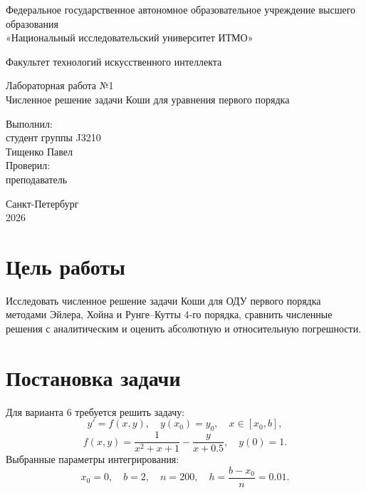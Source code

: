 \documentclass[12pt,a4paper]{article}
\begin{document}
\begin{titlepage}
\begin{center}
Федеральное государственное автономное образовательное учреждение высшего образования\\
«Национальный исследовательский университет ИТМО»
\end{center}

\vspace{1cm}
\begin{center}
Факультет технологий искусственного интеллекта
\end{center}

\vfill
\begin{center}
{\Large Лабораторная работа №1}\\[0.4cm]
{\large Численное решение задачи Коши для уравнения первого порядка}
\end{center}
\vfill

\begin{flushright}
Выполнил:\\
студент группы J3210\\
Тищенко Павел\\[0.8cm]
Проверил:\\
преподаватель\\
\underline{\hspace{4cm}}
\end{flushright}

\vfill
\begin{center}
Санкт-Петербург\\
2026
\end{center}
\end{titlepage}

\tableofcontents
\newpage

\section{Цель работы}
Исследовать численное решение задачи Коши для ОДУ первого порядка методами Эйлера, Хойна и Рунге--Кутты 4-го порядка, сравнить численные решения с аналитическим и оценить абсолютную и относительную погрешности.

\section{Постановка задачи}
Для варианта 6 требуется решить задачу:
\[
y' = f(x,y), \quad y(x_0)=y_0, \quad x\in[x_0,b],
\]
\[
f(x,y)=\frac{1}{x^2+x+1}-\frac{y}{x+0.5}, \quad y(0)=1.
\]
Выбранные параметры интегрирования:
\[
x_0=0,\quad b=2,\quad n=200,\quad h=\frac{b-x_0}{n}=0.01.
\]
\end{document}
